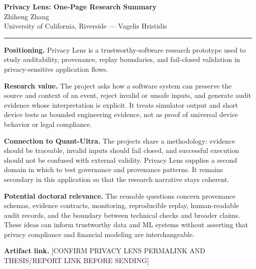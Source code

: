 \documentclass[11pt]{article}
\newcommand{\ApplicantName}{Zhiheng Zhang}
\begin{document}
\begin{center}
{\LARGE\bfseries Privacy Lens: One-Page Research Summary}\\[0.25em]
{\large \ApplicantName}\\
University of California, Riverside --- Vagelis Hristidis
\end{center}
\vspace{0.35em}\hrule\vspace{0.65em}

\textbf{Positioning.} Privacy Lens is a trustworthy-software research prototype used to study auditability, provenance, replay boundaries, and fail-closed validation in privacy-sensitive application flows.

\textbf{Research value.} The project asks how a software system can preserve the source and context of an event, reject invalid or unsafe inputs, and generate audit evidence whose interpretation is explicit. It treats simulator output and short device tests as bounded engineering evidence, not as proof of universal device behavior or legal compliance.

\textbf{Connection to Quant-Ultra.} The projects share a methodology: evidence should be traceable, invalid inputs should fail closed, and successful execution should not be confused with external validity. Privacy Lens supplies a second domain in which to test governance and provenance patterns. It remains secondary in this application so that the research narrative stays coherent.

\textbf{Potential doctoral relevance.} The reusable questions concern provenance schemas, evidence contracts, monitoring, reproducible replay, human-readable audit records, and the boundary between technical checks and broader claims. These ideas can inform trustworthy data and ML systems without asserting that privacy compliance and financial modeling are interchangeable.

\textbf{Artifact link.} [CONFIRM PRIVACY LENS PERMALINK AND THESIS/REPORT LINK BEFORE SENDING]
\end{document}
